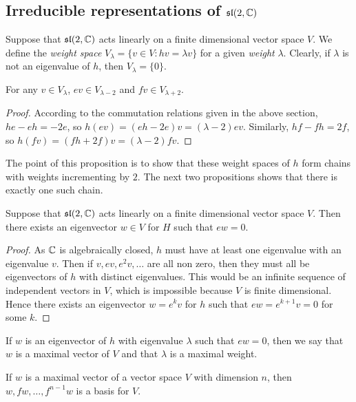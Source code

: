 \documentclass[a4paper]{article}
\begin{document}
\subsection{Irreducible representations of \texorpdfstring{$\mathfrak{sl}(2, \mathbb{C})$}{sl(2, \C)}}
Suppose that $\mathfrak{sl}(2, \mathbb{C})$ acts linearly on a finite dimensional vector space $V$. We define the \textit{weight space} $V_\lambda = \{v \in V : hv = \lambda v\}$ for a given \textit{weight} $\lambda$. Clearly, if $\lambda$ is not an eigenvalue of $h$, then $V_\lambda = \{0\}$.

\begin{prop}
    For any $v \in V_\lambda$, $e v \in V_{\lambda - 2}$ and $f v \in V_{\lambda + 2}$.
\end{prop}

\begin{proof}
    According to the commutation relations given in the above section, $he - eh = -2e$, so $h(ev) = (eh - 2e) v = (\lambda - 2)ev$. Similarly, $hf - fh = 2f$, so $h(fv) = (fh + 2f) v = (\lambda - 2)fv$.
\end{proof}

The point of this proposition is to show that these weight spaces of $h$ form chains with weights incrementing by $2$. The next two propositions shows that there is exactly one such chain.

\begin{prop}
    Suppose that $\mathfrak{sl}(2, \mathbb{C})$ acts linearly on a finite dimensional vector space $V$. Then there exists an eigenvector $w \in V$ for $H$ such that $e w = 0$.
\end{prop}

\begin{proof}
    As $\mathbb{C}$ is algebraically closed, $h$ must have at least one eigenvalue with an eigenvalue $v$. Then if $v, ev, e^2v, \hdots$ are all non zero, then they must all be eigenvectors of $h$ with distinct eigenvalues. This would be an infinite sequence of independent vectors in $V$, which is impossible because $V$ is finite dimensional. Hence there exists an eigenvector $w = e^k v$ for $h$ such that $ew = e^{k+1}v = 0$ for some $k$. 
\end{proof}

If $w$ is an eigenvector of $h$ with eigenvalue $\lambda$ such that $e w = 0$, then we say that $w$ is a maximal vector of $V$ and that $\lambda$ is a maximal weight.

\begin{prop}
    If $w$ is a maximal vector of a vector space $V$ with dimension $n$, then $w, fw, \hdots, f^{n-1} w$ is a basis for $V$.
\end{prop}
\end{document}
